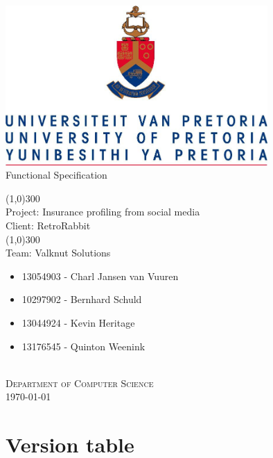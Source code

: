 \documentclass{article}
\begin{document}
	\begin{titlepage}
		\begin{center}
			\includegraphics[width=10cm]{images/UP.jpg}  \\
			[0.5cm]
			\huge{
			Functional Specification\\
			}

			\line(1,0){300}\\
			[0.2cm]
			\LARGE{Project: Insurance profiling from social media\\
			Client: RetroRabbit} \\
			\line(1,0){300}\\
			\LARGE{Team: Valknut Solutions}\\
			[1.0cm]
			\large
			{
			\begin{itemize}
				\item 13054903 - Charl Jansen van Vuuren
				\item 10297902 - Bernhard Schuld
				\item 13044924 - Kevin Heritage
				\item 13176545 - Quinton Weenink\\
			\end{itemize}
			}
			\textsc{\large}\\
		[3.0cm]
		\textsc{\large  Department of Computer Science}\\
		[0.5cm]
		\textsc{\large \today}\\
		\end{center}


	\end{titlepage}
	\cleardoublepage
	\tableofcontents
	\cleardoublepage
\section{Version table}	
	\begin{versionhistory}
	\end{versionhistory}	
\end{document}
